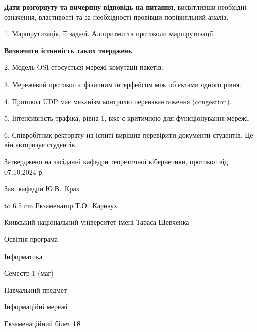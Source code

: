 \documentclass[12pt, ukrainian]{article}
\begin{document}
{
\qquad\textbf{Дати розгорнуту та вичерпну відповідь на питання}, висвітливши необхідні означення, властивості та за необхідності провівши порівняльний аналіз.

1. Маршрутизація, її задачі. Алгоритми та протоколи маршрутизації.



\qquad\textbf{Визначити істинність таких тверджень}.

2. Модель OSI стосується мережі комутації пакетів.


3. Мережевий протокол є фізичним інтерфейсом між об'єктами одного рівня.


4. Протокол UDP має механізм контролю перенавантаження (congestion).


5. Інтенсивність трафіка, рівна 1, вже є критичною для функціонування мережі.


6. Співробітник ректорату на іспиті вирішив перевірити документи студентів. Це він авторизує студентів.

}
{\smallskip\smallskip \begin {scriptsize} Затверджено на засіданні кафедри теоретичної кібернетики, протокол   від   07.10.2024 р.\par\smallskip\smallskip\smallskip\smallskip
{\parbox {6.5 cm} {Зав. кафедри \dotfill Ю.В.~Крак}}\hspace {0.7cm} {\hbox to 6.5 cm { Екзаменатор \dotfill Т.О.~Карнаух}} \end{scriptsize}}
\vspace{0.9cm}
{{\begin {scriptsize}\par
{ \center  Київський національний університет імені Тараса Шевченка \par}
{\parbox {5 cm}{Освітня програма \hfill}{\parbox {7 cm}{Інформатика\hfill}}\parbox {6 cm}{\hfill Семестр 1 (маг)}}\par
{\parbox {5 cm} {Навчальний предмет \hfill}\parbox {7 cm}{Інформаційні мережі \hfill}\parbox {6cm}{\hfill}\par}\vspace{-15pt} \end{scriptsize}}{\center Екзаменаційний білет \No \textbf { 18 }\par}}
\end{document}
